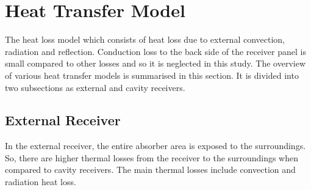 \section{Heat Transfer Model}
The heat loss model which consists of heat loss due to external convection, radiation and reflection. Conduction loss to the back side of the receiver panel is small compared to other losses \cite{Stine.1985} and so it is neglected in this study. The overview of various heat transfer models is summarised in this section. It is divided into two subsections as external and cavity receivers. 
\subsection{External Receiver}
In the external receiver, the entire absorber area is exposed to the surroundings. So, there are higher thermal losses from the receiver to the surroundings when compared to cavity receivers. The main thermal losses include convection and radiation heat loss.
